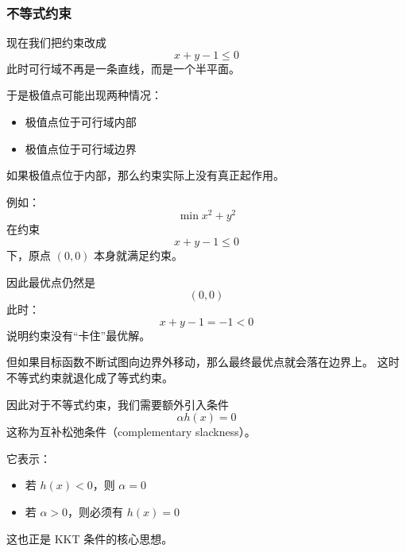 \subsubsection{不等式约束}

现在我们把约束改成
\begin{equation}
x+y-1\le0
\end{equation}
此时可行域不再是一条直线，而是一个半平面。

于是极值点可能出现两种情况：
\begin{itemize}
\item 极值点位于可行域内部
\item 极值点位于可行域边界
\end{itemize}

如果极值点位于内部，那么约束实际上没有真正起作用。

例如：
\begin{equation}
\min x^2+y^2
\end{equation}
在约束
\begin{equation}
x+y-1\le0
\end{equation}
下，原点 $(0,0)$ 本身就满足约束。

因此最优点仍然是
\begin{equation}
(0,0)
\end{equation}
此时：
\begin{equation}
x+y-1=-1<0
\end{equation}
说明约束没有“卡住”最优解。

但如果目标函数不断试图向边界外移动，那么最终最优点就会落在边界上。
这时不等式约束就退化成了等式约束。

因此对于不等式约束，我们需要额外引入条件
\begin{equation}
\alpha h(x)=0
\end{equation}
这称为互补松弛条件（complementary slackness）。

它表示：
\begin{itemize}
\item 若 $h(x)<0$，则 $\alpha=0$
\item 若 $\alpha>0$，则必须有 $h(x)=0$
\end{itemize}

这也正是 KKT 条件的核心思想。